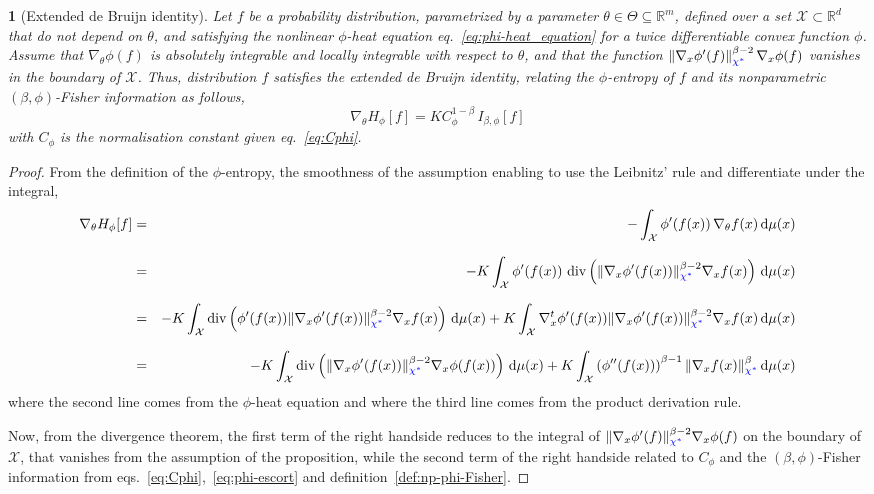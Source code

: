 \documentclass[english,sort&compress]{elsarticle}
\theoremstyle{definition}
\theoremstyle{plain}
\newtheorem{prop}{\protect\propositionname}
\theoremstyle{plain}
\providecommand{\propositionname}{Proposition}
\def\dmu{\mathrm{d}\mu}
\def\Rset{\mathbb{R}}
\def\X{\mathcal{X}}
\def\div{\operatorname{div}}
\begin{document}
\begin{prop}[Extended de Bruijn identity]\label{prop:phiDeBruijn}
  Let $f$ be a probability distribution, parametrized by a parameter $\theta \in
  \Theta \subseteq \Rset^m$, defined over a set $\X \subset \Rset^d$ that do not
  depend  on  $\theta$,  and   satisfying  the  nonlinear  $\phi$-heat  equation
  eq.~\eqref{eq:phi-heat_equation}  for a  twice differentiable  convex function
  $\phi$.   Assume that  $\nabla_\theta  \phi(f)$ is  absolutely integrable  and
  locally integrable  with respect to  $\theta$, and that the  function $\left\|
    \nabla_x   \phi'(f)   \right\|_{{\color{blue} \chi^*}}^{\beta-2}   \nabla_x   \phi(f)$
  vanishes  in the  boundary  of  $\X$.  Thus,  distribution  $f$ satisfies  the
  extended  de Bruijn  identity,  relating  the $\phi$-entropy  of  $f$ and  its
  nonparametric $(\beta,\phi)$-Fisher information as follows,
%
\begin{equation}
\label{eq:phiDeBruijn}
\nabla_\theta H_\phi[f] = K C_\phi^{1-\beta} \, I_{\beta,\phi}[f]
\end{equation}
%
with $C_\phi$ is the normalisation constant given eq.~\eqref{eq:Cphi}. 
\end{prop}

\begin{proof}
  From the  definition of the  $\phi$-entropy, the smoothness of  the assumption
  enabling to use the Leibnitz' rule and differentiate under the integral,
%
\begin{eqnarray*}
\displaystyle \nabla_\theta H_\phi[f] & = & \displaystyle -
\int_\X \phi'(f(x)) \, \nabla_\theta f(x) \, \dmu(x)\\[2.5mm]
%
& = & \displaystyle - K \int_\X \phi'(f(x)) \, \div\left( \| \nabla_x
\phi'(f(x)) \|_{\SZ{\chi^*}}^{\beta-2} \nabla_x f(x) \right) \, \dmu(x)\\[2.5mm]
%
& = & \displaystyle - K \int_\X \div\left( \phi'(f(x)) \| \nabla_x \phi'(f(x))
\|_{\SZ{\chi^*}}^{\beta-2} \nabla_x f(x) \right) \, \dmu(x) + K \int_\X \nabla_x^t \phi'(f(x)) \|
\nabla_x \phi'(f(x)) \|_{\SZ{\chi^*}}^{\beta-2} \nabla_x f(x) \, \dmu(x)\\[2.5mm]
%
& = & \displaystyle - K \int_\X \div\left( \| \nabla_x \phi'(f(x)) \|_{\SZ{\chi^*}}^{\beta-2}
\nabla_x \phi(f(x)) \right) \, \dmu(x) + K \int_\X \left( \phi''(f(x))
\right)^{\beta-1} \| \nabla_x f(x) \|_{\SZ{\chi^*}}^\beta \, \dmu(x)
\end{eqnarray*}
%
where the  second line comes from  the $\phi$-heat equation and  where the third
line comes from the product derivation rule.

Now, from the  divergence theorem, the first term of  the right handside reduces
to the integral  of $\| \nabla_x \phi'(f) \|_{{\color{blue} \chi^*}}^{\beta-2}  \nabla_x \phi(f)$ on the
boundary of  $\X$, that vanishes from  the assumption of  the proposition, while
the  second   term  of   the  right  handside   related  to  $C_\phi$   and  the
$(\beta,\phi)$-Fisher                      information                      from
eqs.~\eqref{eq:Cphi},~\eqref{eq:phi-escort}                                   and
definition~\ref{def:np-phi-Fisher}.
\end{proof}
\end{document}
